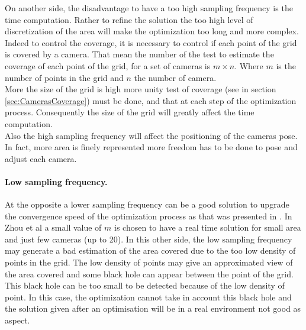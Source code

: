 On another side, the disadvantage to have a too high sampling frequency is the time computation. Rather to refine the solution the too high level of discretization of the area will make the optimization too long and more complex. Indeed to control the coverage, it is necessary to control if each point of the grid is covered by a camera.  
That mean the number of the test to estimate the coverage of each point of the grid, for a set of cameras is $m\times n$. Where $m$ is the number of points in the grid and $n$ the number of camera. \\
 More the size of the grid is high more unity test of coverage (see in section \ref{sec:CamerasCoverage}) must be done, and that at each step of the optimization process.  Consequently the size of the grid will greatly affect the time computation.  \\
Also the high sampling frequency will affect the positioning of the cameras pose. In fact, more area is finely represented more freedom has to be done to pose and adjust each camera. 



\paragraph*{Low sampling frequency.}
At the opposite a lower sampling frequency can be a good solution to upgrade the convergence speed of the optimization process as that was presented in \cite{8*zhou2011}. In Zhou et al \cite{8*zhou2011} a small value of $m$ is chosen to have a real time solution for small area and just few cameras (up to  20). 
In this other side, the low sampling frequency may generate a bad estimation of the area covered due to the too low density of points in the grid. The low density of points may give an approximated view of the area covered and some black hole can appear between the point of the grid. This black hole can be too small to be detected because of the low density of point. In this case, the optimization cannot take in account this black hole and the solution given after an optimisation will be in a real environment not good as aspect. \\



